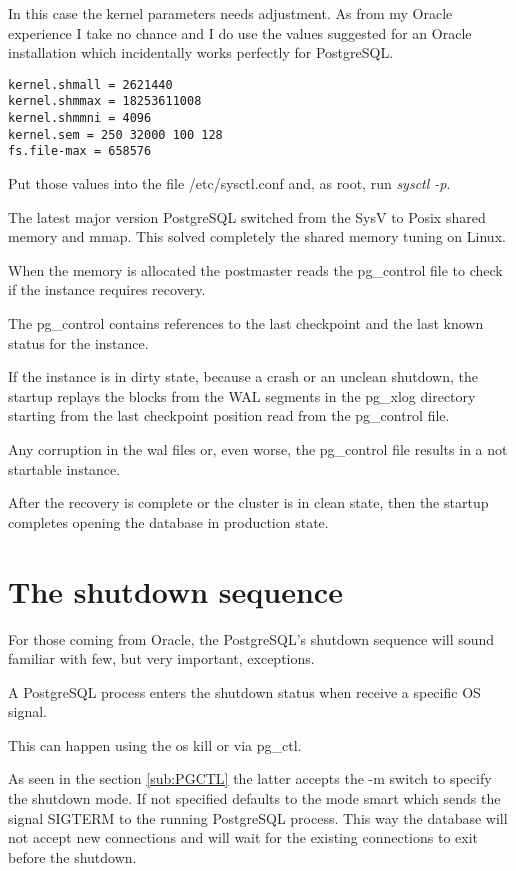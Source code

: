 In this case the kernel parameters needs adjustment.
As from my Oracle experience I take no chance and I do use the values suggested
for an Oracle installation which incidentally works perfectly for PostgreSQL.

\begin{verbatim}
kernel.shmall = 2621440
kernel.shmmax = 18253611008
kernel.shmmni = 4096
kernel.sem = 250 32000 100 128
fs.file-max = 658576
\end{verbatim}

Put those values into the file /etc/sysctl.conf and, as root, run 
\textit{sysctl -p}.

The latest major version PostgreSQL switched from the SysV to Posix shared
memory and mmap. This solved completely the shared memory tuning on Linux.

When the memory is allocated the postmaster reads the pg\_control
file to check if the instance requires recovery.

The pg\_control contains references to the last checkpoint and the last known
status for the instance. 

If  the instance is in dirty state, because a crash or an unclean shutdown, the
startup replays the blocks from the WAL segments in the pg\_xlog directory
starting from the last checkpoint position read from the pg\_control file.

Any corruption in the wal files or, even worse, the pg\_control file results in
a not startable instance.

After the recovery is complete or the cluster is in clean state, then  the
startup completes opening the database in production state. 


\section{The shutdown sequence} 
\label{sec:SHUTDOWN_SEQ}
For those coming from Oracle, the PostgreSQL's shutdown sequence will sound 
familiar with few, but very important, exceptions.

A PostgreSQL process enters the shutdown status when receive a specific OS 
signal. 

This can happen using the os kill or via pg\_ctl. 

As seen in the section \ref{sub:PGCTL} the latter accepts the -m switch to 
specify the shutdown mode. If not specified defaults to the mode smart which 
sends the signal SIGTERM to the running PostgreSQL process. This way the 
database will not accept new connections and will wait for the existing 
connections to exit before the shutdown. 

